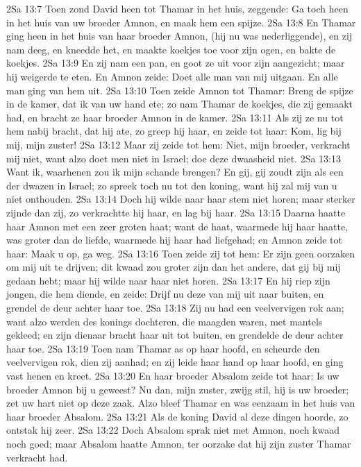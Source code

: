 2Sa 13:7  Toen zond David heen tot Thamar in het huis, zeggende: Ga toch heen in het huis van uw broeder Amnon, en maak hem een spijze.
2Sa 13:8  En Thamar ging heen in het huis van haar broeder Amnon, (hij nu was nederliggende), en zij nam deeg, en kneedde het, en maakte koekjes toe voor zijn ogen, en bakte de koekjes.
2Sa 13:9  En zij nam een pan, en goot ze uit voor zijn aangezicht; maar hij weigerde te eten. En Amnon zeide: Doet alle man van mij uitgaan. En alle man ging van hem uit.
2Sa 13:10  Toen zeide Amnon tot Thamar: Breng de spijze in de kamer, dat ik van uw hand ete; zo nam Thamar de koekjes, die zij gemaakt had, en bracht ze haar broeder Amnon in de kamer.
2Sa 13:11  Als zij ze nu tot hem nabij bracht, dat hij ate, zo greep hij haar, en zeide tot haar: Kom, lig bij mij, mijn zuster!
2Sa 13:12  Maar zij zeide tot hem: Niet, mijn broeder, verkracht mij niet, want alzo doet men niet in Israel; doe deze dwaasheid niet.
2Sa 13:13  Want ik, waarhenen zou ik mijn schande brengen? En gij, gij zoudt zijn als een der dwazen in Israel; zo spreek toch nu tot den koning, want hij zal mij van u niet onthouden.
2Sa 13:14  Doch hij wilde naar haar stem niet horen; maar sterker zijnde dan zij, zo verkrachtte hij haar, en lag bij haar.
2Sa 13:15  Daarna haatte haar Amnon met een zeer groten haat; want de haat, waarmede hij haar haatte, was groter dan de liefde, waarmede hij haar had liefgehad; en Amnon zeide tot haar: Maak u op, ga weg.
2Sa 13:16  Toen zeide zij tot hem: Er zijn geen oorzaken om mij uit te drijven; dit kwaad zou groter zijn dan het andere, dat gij bij mij gedaan hebt; maar hij wilde naar haar niet horen.
2Sa 13:17  En hij riep zijn jongen, die hem diende, en zeide: Drijf nu deze van mij uit naar buiten, en grendel de deur achter haar toe.
2Sa 13:18  Zij nu had een veelvervigen rok aan; want alzo werden des konings dochteren, die maagden waren, met mantels gekleed; en zijn dienaar bracht haar uit tot buiten, en grendelde de deur achter haar toe.
2Sa 13:19  Toen nam Thamar as op haar hoofd, en scheurde den veelvervigen rok, dien zij aanhad; en zij leide haar hand op haar hoofd, en ging vast henen en kreet.
2Sa 13:20  En haar broeder Absalom zeide tot haar: Is uw broeder Amnon bij u geweest? Nu dan, mijn zuster, zwijg stil, hij is uw broeder; zet uw hart niet op deze zaak. Alzo bleef Thamar en was eenzaam in het huis van haar broeder Absalom.
2Sa 13:21  Als de koning David al deze dingen hoorde, zo ontstak hij zeer.
2Sa 13:22  Doch Absalom sprak niet met Amnon, noch kwaad noch goed; maar Absalom haatte Amnon, ter oorzake dat hij zijn zuster Thamar verkracht had.
